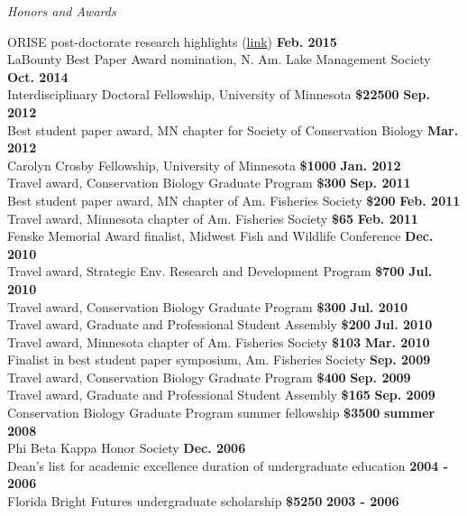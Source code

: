 \documentclass[letterpaper,12pt]{article}
\newcommand{\sectitle}[1]{\vspace{\baselineskip} \centerline{\large{\textit{#1}}}}
\begin{document}
\sectitle{Honors and Awards}

ORISE post-doctorate research highlights (\href{http://orise.orau.gov/science-education/research-experiences/postdoc/15-marcus-beck.aspx}{link}) \hfill {\bf Feb. 2015} \\
LaBounty Best Paper Award nomination, N. Am. Lake Management Society \hfill {\bf Oct. 2014} \\
Interdisciplinary Doctoral Fellowship, University of Minnesota {\bf \$22500} \hfill {\bf Sep. 2012} \\
Best student paper award, MN chapter for Society of Conservation Biology \hfill {\bf Mar. 2012} \\
Carolyn Crosby Fellowship, University of Minnesota {\bf \$1000} \hfill {\bf Jan. 2012} \\
Travel award, Conservation Biology Graduate Program {\bf \$300} \hfill {\bf Sep. 2011} \\
Best student paper award, MN chapter of Am. Fisheries Society {\bf \$200} \hfill {\bf Feb. 2011} \\
Travel award, Minnesota chapter of Am. Fisheries Society {\bf \$65} \hfill {\bf Feb. 2011} \\
Fenske Memorial Award finalist, Midwest Fish and Wildlife Conference \hfill {\bf Dec. 2010} \\
Travel award, Strategic Env. Research and Development Program {\bf \$700} \hfill {\bf Jul. 2010} \\
Travel award, Conservation Biology Graduate Program {\bf \$300} \hfill {\bf Jul. 2010} \\
Travel award, Graduate and Professional Student Assembly {\bf \$200} \hfill {\bf Jul. 2010} \\
Travel award, Minnesota chapter of Am. Fisheries Society {\bf \$103} \hfill {\bf Mar. 2010} \\
Finalist in best student paper symposium, Am. Fisheries Society \hfill {\bf Sep. 2009} \\
Travel award, Conservation Biology Graduate Program {\bf \$400} \hfill {\bf Sep. 2009} \\
Travel award, Graduate and Professional Student Assembly {\bf \$165} \hfill {\bf Sep. 2009} \\
Conservation Biology Graduate Program summer fellowship {\bf \$3500} \hfill {\bf summer 2008} \\
Phi Beta Kappa Honor Society \hfill {\bf Dec. 2006} \\
Dean's list for academic excellence duration of undergraduate education \hfill {\bf 2004 - 2006} \\
Florida Bright Futures undergraduate scholarship {\bf \$5250} \hfill {\bf 2003 - 2006} 
\end{document}
